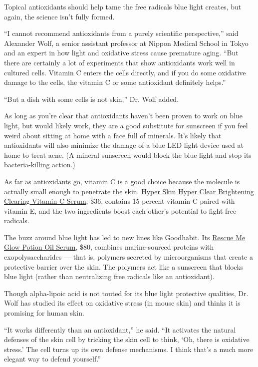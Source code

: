 Topical antioxidants should help tame the free radicals blue light
creates, but again, the science isn't fully formed.

``I cannot recommend antioxidants from a purely scientific
perspective,'' said Alexander Wolf, a senior assistant professor at
Nippon Medical School in Tokyo and an expert in how light and oxidative
stress cause premature aging. ``But there are certainly a lot of
experiments that show antioxidants work well in cultured cells. Vitamin
C enters the cells directly, and if you do some oxidative damage to the
cells, the vitamin C or some antioxidant definitely helps.''

``But a dish with some cells is not skin,'' Dr. Wolf added.

As long as you're clear that antioxidants haven't been proven to work on
blue light, but would likely work, they are a good substitute for
sunscreen if you feel weird about sitting at home with a face full of
minerals. It's likely that antioxidants will also minimize the damage of
a blue LED light device used at home to treat acne. (A mineral sunscreen
would block the blue light and stop its bacteria-killing action.)

As far as antioxidants go, vitamin C is a good choice because the
molecule is actually small enough to penetrate the skin.
\href{https://gethyperskin.com/products/hyper-clear}{Hyper Skin Hyper
Clear Brightening Clearing Vitamin C Serum}, \$36, contains 15 percent
vitamin C paired with vitamin E, and the two ingredients boost each
other's potential to fight free radicals.

The buzz around blue light has led to new lines like Goodhabit. Its
\href{https://goodhabitskin.com/products/glow-potion-oil-serum}{Rescue
Me Glow Potion Oil Serum}, \$80, combines marine-sourced proteins with
exopolysaccharides --- that is, polymers secreted by microorganisms that
create a protective barrier over the skin. The polymers act like a
sunscreen that blocks blue light (rather than neutralizing free radicals
like an antioxidant).

Though alpha-lipoic acid is not touted for its blue light protective
qualities, Dr. Wolf has studied its effect on oxidative stress (in mouse
skin) and thinks it is promising for human skin.

``It works differently than an antioxidant,'' he said. ``It activates
the natural defenses of the skin cell by tricking the skin cell to
think, `Oh, there is oxidative stress.' The cell turns up its own
defense mechanisms. I think that's a much more elegant way to defend
yourself.''

